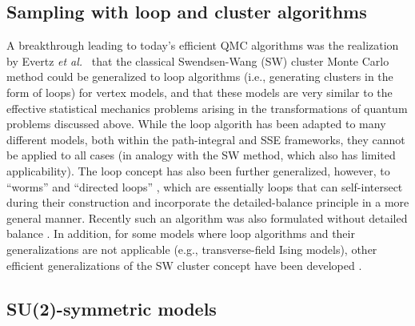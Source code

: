 \documentclass[10pt,pre,aps,twocolumn,showpacs,subscriptaddresses,floatfix]{revtex4}
\begin{document}
\subsection{Sampling with loop and cluster algorithms}

A breakthrough leading to today's efficient QMC algorithms was the realization by Evertz {\it et al.}~\cite{Evertz93} that the classical Swendsen-Wang (SW) cluster 
Monte Carlo method \cite{Swendsen88} could be generalized to loop algorithms (i.e., generating clusters in the form of loops) for vertex models, and that these models 
are very similar to the effective statistical mechanics problems arising in the transformations of quantum problems discussed above. While the loop algorith has 
been adapted to many different models, both within the path-integral \cite{Kawashima94,Beard96,Harada02,Evertz03} and SSE \cite{Sandvik99} frameworks, they cannot 
be applied to all cases (in analogy with the SW method, which also has limited applicability). The loop concept has also been further generalized, 
however, to ``worms'' \cite{Prokofev96,Prokofev98, WormA} and ``directed loops'' \cite{Sandvik99,Syljuasen02}, which are essentially loops that can self-intersect 
during their construction and incorporate the detailed-balance principle in a more general manner. Recently such 
an algorithm was also formulated without detailed balance \cite{Suwa10}. In addition, for some models where loop algorithms and their generalizations are not 
applicable (e.g., transverse-field Ising models), other efficient generalizations of the SW cluster concept have been developed \cite{Rieger99,Sandvik03}.

\subsection{SU(2)-symmetric models}
\label{su2method}
\end{document}
